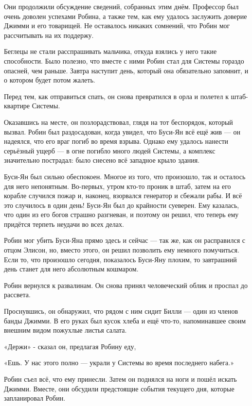 \documentclass[a5paper, 9pt,
final, openany, twoside=true]{memoir}
\begin{document}
Они продолжили обсуждение сведений, собранных этим днём. Профессор был очень доволен успехами Робина, а также тем, как ему удалось заслужить доверие Джимми и его товарищей. Не оставалось никаких сомнений, что Робин мог рассчитывать на их поддержу.

Беглецы не стали расспрашивать мальчика, откуда взялись у него такие способности. Было полезно, что вместе с ними Робин стал для Системы гораздо опасней, чем раньше. Завтра наступит день, который она обязательно запомнит, и о котором будет потом жалеть.

Перед тем, как отправиться спать, он снова превратился в орла и полетел к штаб-квартире Системы.

Оказавшись на месте, он позлорадствовал, глядя на тот беспорядок, который вызвал. Робин был раздосадован, когда увидел, что Буси-Ян всё ещё жив — он надеялся, что его враг погиб во время взрыва. Однако ему удалось нанести серьёзный ущерб — в огне погибло много людей Системы, а комплекс значительно пострадал: было снесено всё западное крыло здания.

Буси-Ян был сильно обеспокоен. Многое из того, что произошло, так и осталось для него непонятным. Во-первых, утром кто-то проник в штаб, затем на его корабле случился пожар и, наконец, взорвался генератор и сбежали рабы. И всё это случилось в один день! Буси-Ян был до крайности суеверен. Ему казалась, что один из его богов страшно разгневан, и поэтому он решил, что теперь ему придётся терпеть неудачи во всех делах.

Робин мог убить Буси-Яна прямо здесь и сейчас — так же, как он расправился с отцом Элисон, но, вместо этого, он решил позволить ему немного помучиться. Если то, что произошло сегодня, показалось Буси-Яну плохим, то завтрашний день станет для него абсолютным кошмаром.\bigskip

Робин вернулся к развалинам. Он снова принял человеческий облик и проспал до рассвета.

Проснувшись, он обнаружил, что рядом с ним сидит Билли — один из членов банды Джимми. В его руках был кусок хлеба и ещё что-то, напоминавшее своим внешним видом пожухлые листья салата.

«Держи» - сказал он, предлагая Робину еду,

«Ешь. У нас этого полно — украли у Системы во время последнего набега.»

Робин съел всё, что ему принесли. Затем он поднялся на ноги и пошёл искать Джимми. Вместе, они обсудили предстоящие события текущего дня, которые запланировал Робин.
\end{document}

